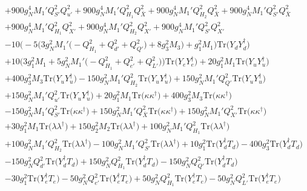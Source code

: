{\begin{align}
 &+900 g_{N}^{4} M_1' Q_{S'}^{2} Q_{u'}^{2} +900 g_{N}^{4} M_1' Q_{H_1}^{2} Q_{\bar{X}}^{2} +900 g_{N}^{4} M_1' Q_{H_2}^{2} Q_{\bar{X}}^{2} +900 g_{N}^{4} M_1' Q_{S'}^{2} Q_{\bar{X}}^{2} \nonumber \\ 
 &+900 g_{N}^{4} M_1' Q_{H_1}^{2} Q_{X'}^{2} +900 g_{N}^{4} M_1' Q_{H_2}^{2} Q_{X'}^{2} +900 g_{N}^{4} M_1' Q_{S'}^{2} Q_{X'}^{2} \nonumber \\ 
 &-10 \Big(-5 \Big(3 g_{N}^{2} M_1' \Big(- Q_{H_1}^{2}  + Q_{d'}^{2} + Q_{Q'}^{2}\Big) + 8 g_{3}^{2} M_3 \Big) + g_{1}^{2} M_1 \Big)\mbox{Tr}\Big({Y_d  Y_{d}^{\dagger}}\Big) \nonumber \\ 
 &+10 \Big(3 g_{1}^{2} M_1  + 5 g_{N}^{2} M_1' \Big(- Q_{H_1}^{2}  + Q_{e'}^{2} + Q_{L'}^{2}\Big)\Big)\mbox{Tr}\Big({Y_e  Y_{e}^{\dagger}}\Big) +20 g_{1}^{2} M_1 \mbox{Tr}\Big({Y_u  Y_{u}^{\dagger}}\Big) \nonumber \\ 
 &+400 g_{3}^{2} M_3 \mbox{Tr}\Big({Y_u  Y_{u}^{\dagger}}\Big) -150 g_{N}^{2} M_1' Q_{H_2}^{2} \mbox{Tr}\Big({Y_u  Y_{u}^{\dagger}}\Big) +150 g_{N}^{2} M_1' Q_{Q'}^{2} \mbox{Tr}\Big({Y_u  Y_{u}^{\dagger}}\Big) \nonumber \\ 
 &+150 g_{N}^{2} M_1' Q_{u'}^{2} \mbox{Tr}\Big({Y_u  Y_{u}^{\dagger}}\Big) +20 g_{1}^{2} M_1 \mbox{Tr}\Big({\kappa  \kappa^{\dagger}}\Big) +400 g_{3}^{2} M_3 \mbox{Tr}\Big({\kappa  \kappa^{\dagger}}\Big) \nonumber \\ 
 &-150 g_{N}^{2} M_1' Q_{S'}^{2} \mbox{Tr}\Big({\kappa  \kappa^{\dagger}}\Big) +150 g_{N}^{2} M_1' Q_{\bar{X}}^{2} \mbox{Tr}\Big({\kappa  \kappa^{\dagger}}\Big) +150 g_{N}^{2} M_1' Q_{X'}^{2} \mbox{Tr}\Big({\kappa  \kappa^{\dagger}}\Big) \nonumber \\ 
 &+30 g_{1}^{2} M_1 \mbox{Tr}\Big({\lambda  \lambda^{\dagger}}\Big) +150 g_{2}^{2} M_2 \mbox{Tr}\Big({\lambda  \lambda^{\dagger}}\Big) +100 g_{N}^{2} M_1' Q_{H_1}^{2} \mbox{Tr}\Big({\lambda  \lambda^{\dagger}}\Big) \nonumber \\ 
 &+100 g_{N}^{2} M_1' Q_{H_2}^{2} \mbox{Tr}\Big({\lambda  \lambda^{\dagger}}\Big) -100 g_{N}^{2} M_1' Q_{S'}^{2} \mbox{Tr}\Big({\lambda  \lambda^{\dagger}}\Big) +10 g_{1}^{2} \mbox{Tr}\Big({Y_{d}^{\dagger}  T_d}\Big) -400 g_{3}^{2} \mbox{Tr}\Big({Y_{d}^{\dagger}  T_d}\Big) \nonumber \\ 
 &-150 g_{N}^{2} Q_{d'}^{2} \mbox{Tr}\Big({Y_{d}^{\dagger}  T_d}\Big) +150 g_{N}^{2} Q_{H_1}^{2} \mbox{Tr}\Big({Y_{d}^{\dagger}  T_d}\Big) -150 g_{N}^{2} Q_{Q'}^{2} \mbox{Tr}\Big({Y_{d}^{\dagger}  T_d}\Big) \nonumber \\ 
 &-30 g_{1}^{2} \mbox{Tr}\Big({Y_{e}^{\dagger}  T_e}\Big) -50 g_{N}^{2} Q_{e'}^{2} \mbox{Tr}\Big({Y_{e}^{\dagger}  T_e}\Big) +50 g_{N}^{2} Q_{H_1}^{2} \mbox{Tr}\Big({Y_{e}^{\dagger}  T_e}\Big) -50 g_{N}^{2} Q_{L'}^{2} \mbox{Tr}\Big({Y_{e}^{\dagger}  T_e}\Big) \nonumber \\ 

\end{align}}
